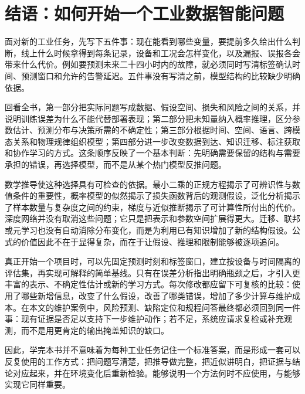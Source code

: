﻿\documentclass[a4paper,UTF8,zihao=-4,openany]{ctexbook}
\begin{document}
\backmatter
\chapter*{结语：如何开始一个工业数据智能问题}
面对新的工业任务，先写下五件事：现在能看到哪些变量，要提前多久给出什么判断，线上什么时候拿得到每条记录，设备和工况会怎样变化，以及漏报、误报各会带来什么代价。例如要预测未来二十四小时内的故障，就必须同时写清标签确认时间、预测窗口和允许的告警延迟。五件事没有写清之前，模型结构的比较缺少明确依据。

回看全书，第一部分把实际问题写成数据、假设空间、损失和风险之间的关系，并说明训练误差为什么不能代替部署表现；第二部分把未知量纳入概率推理，区分参数估计、预测分布与决策所需的不确定性；第三部分根据时间、空间、语言、跨模态关系和物理规律组织模型；第四部分进一步改变数据到达、知识迁移、标注获取和协作学习的方式。这条顺序反映了一个基本判断：先明确需要保留的结构与需要承担的错误，再选择模型，而不是从某个热门模型反推问题。

数学推导使这种选择具有可检查的依据。最小二乘的正规方程揭示了可辨识性与数值条件的重要性，概率模型的似然揭示了损失函数背后的观测假设，泛化分析揭示了样本数量与复杂度之间的约束，梯度与近似推断揭示了可计算性所付出的代价。深度网络并没有取消这些问题；它只是把表示和参数空间扩展得更大。迁移、联邦或元学习也没有自动消除分布变化，而是为利用已有知识增加了新的结构假设。公式的价值因此不在于显得复杂，而在于让假设、推理和限制能够被逐项追问。

真正开始一个项目时，可以先固定预测时刻和标签窗口，建立按设备与时间隔离的评估集，再实现可解释的简单基线。只有在误差分析指出明确瓶颈之后，才引入更丰富的表示、不确定性估计或新的学习方式。每次修改都应留下可复核的比较：使用了哪些新增信息，改变了什么假设，改善了哪类错误，增加了多少计算与维护成本。在本文的维护案例中，风险预测、缺陷定位和规程问答最终都必须回到同一件事：现有证据是否足以支持下一步维护动作；若不足，系统应请求复检或补充观测，而不是用更肯定的输出掩盖知识的缺口。

因此，学完本书并不意味着为每种工业任务记住一个标准答案，而是形成一套可以反复使用的工作方式：把问题写清楚，把推导做完整，把近似讲明白，把证据与结论对应起来，并在环境变化后重新检验。能够说明一个方法何时不应使用，与能够实现它同样重要。



\end{document}

